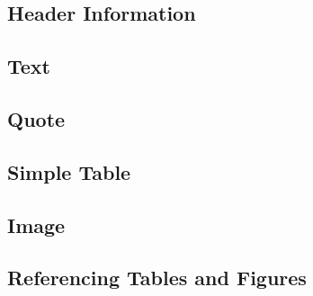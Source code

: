 \documentclass[10pt]{article}
\begin{document}
\subsection*{Header Information}


\subsection*{Text}

\subsection*{Quote}

\subsection*{Simple Table}

\subsection*{Image}

\subsection*{Referencing Tables and Figures}
\end{document}
